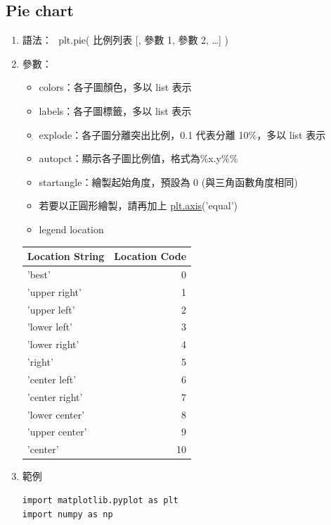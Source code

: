 \documentclass[a4paper,12pt]{article}
\begin{document}
\subsection{Pie chart}
\label{sec:org9b8c72c}
\begin{enumerate}
\item 語法： 
\label{sec:orgaa0db91}
plt.pie( 比例列表 [, 參數 1, 參數 2, \ldots{}] )\\
\item 參數：
\label{sec:orgf05113c}
\begin{itemize}
\item colors：各子圖顏色，多以 list 表示\\
\item labels：各子圖標籤，多以 list 表示\\
\item explode：各子圖分離突出比例，0.1 代表分離 10\%，多以 list 表示\\
\item autopct：顯示各子圖比例值，格式為\%x.y\%\%\\
\item startangle：繪製起始角度，預設為 0 (與三角函數角度相同)\\
\item 若要以正圓形繪製，請再加上 \href{https://matplotlib.org/3.2.1/api/\_as\_gen/matplotlib.pyplot.axis.html}{plt.axis}('equal')\\
\item legend location\\
\end{itemize}
\begin{center}
\begin{tabular}{lr}
Location String & Location Code\\
\hline
'best' & 0\\
'upper right' & 1\\
'upper left' & 2\\
'lower left' & 3\\
'lower right' & 4\\
'right' & 5\\
'center left' & 6\\
'center right' & 7\\
'lower center' & 8\\
'upper center' & 9\\
'center' & 10\\
\end{tabular}
\end{center}
\item 範例
\label{sec:org7ec3337}
\lstset{breaklines=true,language=Python,label= ,caption= ,captionpos=b,firstnumber=1,numbers=left}
\begin{lstlisting}
import matplotlib.pyplot as plt
import numpy as np


\end{lstlisting}
\end{enumerate}
\end{document}

